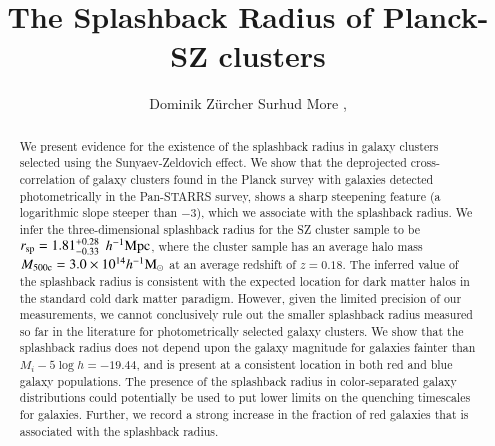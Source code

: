 \documentclass[iop, apjl, twocolappendix, numberedappendix]{emulateapj}
\def\mpch{h^{-1}{\rm Mpc}}
\def\msunh{h^{-1}{\rm M_{\odot}}}
\begin{document}
\title{The Splashback Radius of Planck-SZ clusters}

\author{
Dominik Zürcher 
Surhud More , 
}

\begin{abstract}
We present evidence for the existence of the splashback radius
in galaxy clusters selected using the Sunyaev-Zeldovich effect.
We show that the deprojected cross-correlation of galaxy clusters
found in the Planck survey with galaxies detected photometrically in
the Pan-STARRS survey, shows a sharp steepening feature (a
logarithmic slope steeper than $-3$), which we associate with the
splashback radius.  We infer the three-dimensional splashback radius
for the SZ cluster sample to be $r_{\rm sp}=1.81_{-0.33}^{+0.28}$ $\mpch$,
where the cluster sample has an average halo mass $M_{\rm
500c}=3.0\times10^{14}\msunh$ at an average redshift of $z=0.18$.
The inferred value of the splashback radius is consistent with the
expected location for dark matter halos in the standard cold dark
matter paradigm. However, given the limited precision of our
measurements, we cannot conclusively rule out the smaller splashback
radius measured so far in the literature for photometrically
selected galaxy clusters. We show that the splashback radius does
not depend upon the galaxy magnitude for galaxies fainter than
$M_i-5\log h=-19.44$, and is present at a consistent location in
both red and blue galaxy populations. The presence of the splashback radius in
color-separated galaxy distributions could potentially be used to put lower limits on the
quenching timescales for galaxies. Further, we record a strong increase 
in the fraction of red galaxies that is associated with the splashback radius.

\end{abstract}

\end{document}
